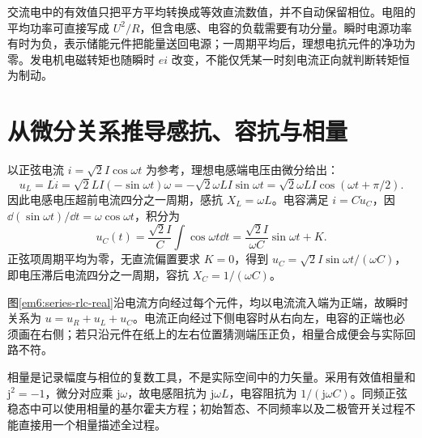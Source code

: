 



交流电中的有效值只把平方平均转换成等效直流数值，并不自动保留相位。电阻的平均功率可直接写成 $U^2/R$，但含电感、电容的负载需要有功分量。瞬时电源功率有时为负，表示储能元件把能量送回电源；一周期平均后，理想电抗元件的净功为零。发电机电磁转矩也随瞬时 $ei$ 改变，不能仅凭某一时刻电流正向就判断转矩恒为制动。


\section{从微分关系推导感抗、容抗与相量}

以正弦电流 $i=\sqrt2I\cos\omega t$ 为参考，理想电感端电压由微分给出：\[u_L=L\dot i=\sqrt2LI(-\sin\omega t)\omega=-\sqrt2\omega LI\sin\omega t=\sqrt2\omega LI\cos(\omega t+\pi/2).\]因此电感电压超前电流四分之一周期，感抗 $X_L=\omega L$。电容满足 $i=C\dot u_C$，因 $\dd(\sin\omega t)/\dd t=\omega\cos\omega t$，积分为
\[
 u_C(t)=\frac{\sqrt2I}{C}\int\cos\omega t\dd t
 =\frac{\sqrt2I}{\omega C}\sin\omega t+K.
\]
正弦项周期平均为零，无直流偏置要求 $K=0$，得到 $u_C=\sqrt2I\sin\omega t/(\omega C)$，即电压滞后电流四分之一周期，容抗 $X_C=1/(\omega C)$。

图\ref{em6:series-rlc-real}沿电流方向经过每个元件，均以电流流入端为正端，故瞬时关系为 $u=u_R+u_L+u_C$。电流正向经过下侧电容时从右向左，电容的正端也必须画在右侧；若只沿元件在纸上的左右位置猜测端压正负，相量合成便会与实际回路不符。


相量是记录幅度与相位的复数工具，不是实际空间中的力矢量。采用有效值相量和 $\mathrm j^2=-1$，微分对应乘 $\mathrm j\omega$，故电感阻抗为 $\mathrm j\omega L$，电容阻抗为 $1/(\mathrm j\omega C)$。同频正弦稳态中可以使用相量的基尔霍夫方程；初始暂态、不同频率以及二极管开关过程不能直接用一个相量描述全过程。

